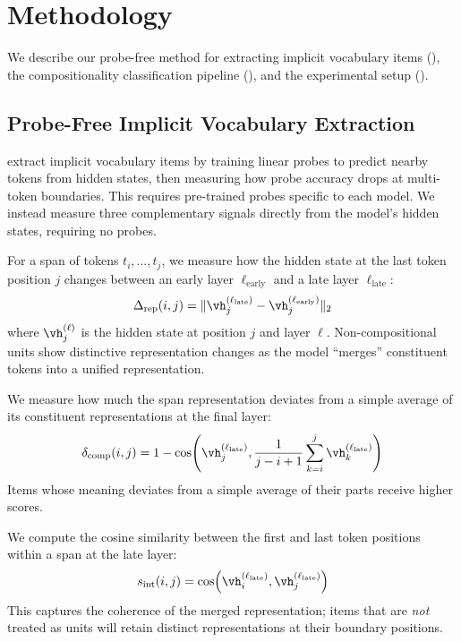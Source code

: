 \section{Methodology}
\label{sec:method}

We describe our probe-free method for extracting implicit vocabulary items (), the compositionality classification pipeline (), and the experimental setup ().

\subsection{Probe-Free Implicit Vocabulary Extraction}
\label{sec:method:extraction}

\citet{feucht2024token} extract implicit vocabulary items by training linear probes to predict nearby tokens from hidden states, then measuring how probe accuracy drops at multi-token boundaries.
This requires pre-trained probes specific to each model.
We instead measure three complementary signals directly from the model's hidden states, requiring no probes.

For a span of tokens $t_i, \ldots, t_j$, we measure how the hidden state at the last token position $j$ changes between an early layer $\ell_{\mathrm{early}}$ and a late layer $\ell_{\mathrm{late}}$:
\begin{equation}
    \repshift(i,j) = \| \vh_j^{(\ell_{\mathrm{late}})} - \vh_j^{(\ell_{\mathrm{early}})} \|_2
    \label{eq:repshift}
\end{equation}
where $\vh_j^{(\ell)}$ is the hidden state at position $j$ and layer $\ell$.
Non-compositional units show distinctive representation changes as the model ``merges'' constituent tokens into a unified representation.

We measure how much the span representation deviates from a simple average of its constituent representations at the final layer:
\begin{equation}
    \compdev(i,j) = 1 - \cos\!\left(\vh_j^{(\ell_{\mathrm{late}})}, \frac{1}{j-i+1}\sum_{k=i}^{j} \vh_k^{(\ell_{\mathrm{late}})}\right)
    \label{eq:compdev}
\end{equation}
Items whose meaning deviates from a simple average of their parts receive higher scores.

We compute the cosine similarity between the first and last token positions within a span at the late layer:
\begin{equation}
    \intsim(i,j) = \cos\!\left(\vh_i^{(\ell_{\mathrm{late}})}, \vh_j^{(\ell_{\mathrm{late}})}\right)
    \label{eq:intsim}
\end{equation}
This captures the coherence of the merged representation; items that are \emph{not} treated as units will retain distinct representations at their boundary positions.

